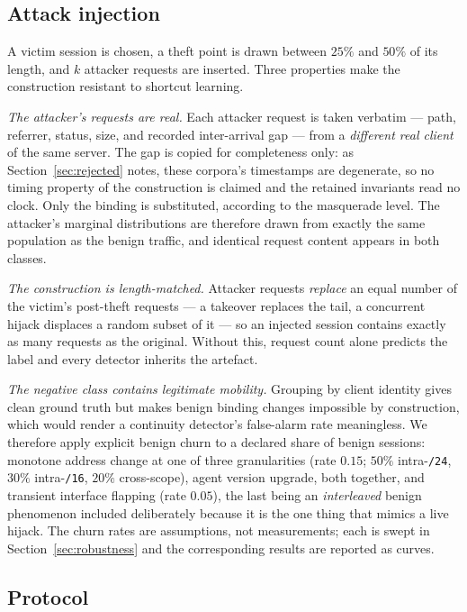\documentclass[conference]{IEEEtran}
\begin{document}
\subsection{Attack injection}

A victim session is chosen, a theft point is drawn between $25\%$ and $50\%$ of
its length, and $k$ attacker requests are inserted.  Three properties make the
construction resistant to shortcut learning.

\emph{The attacker's requests are real.}  Each attacker request is taken
verbatim --- path, referrer, status, size, and recorded inter-arrival gap --- from
a \emph{different real client} of the same server.  The gap is copied for
completeness only: as Section~\ref{sec:rejected} notes, these corpora's
timestamps are degenerate, so no timing property of the construction is claimed
and the retained invariants read no clock.  Only the binding is
substituted, according to the masquerade level.  The attacker's marginal
distributions are therefore drawn from exactly the same population as the benign
traffic, and identical request content appears in both classes.

\emph{The construction is length-matched.}  Attacker requests \emph{replace} an
equal number of the victim's post-theft requests --- a takeover replaces the
tail, a concurrent hijack displaces a random subset of it --- so an injected
session contains exactly as many requests as the original.  Without this,
request count alone predicts the label and every detector inherits the artefact.

\emph{The negative class contains legitimate mobility.}  Grouping by client
identity gives clean ground truth but makes benign binding changes impossible by
construction, which would render a continuity detector's false-alarm rate
meaningless.  We therefore apply explicit benign churn to a declared share of
benign sessions: monotone address change at one of three granularities (rate
$0.15$; $50\%$ intra-\texttt{/24}, $30\%$ intra-\texttt{/16}, $20\%$
cross-scope), agent version upgrade, both together, and transient interface
flapping (rate $0.05$), the last being an \emph{interleaved} benign phenomenon
included deliberately because it is the one thing that mimics a live hijack.
The churn rates are assumptions, not measurements; each is swept in
Section~\ref{sec:robustness} and the corresponding results are reported as
curves.

\subsection{Protocol}
\end{document}
